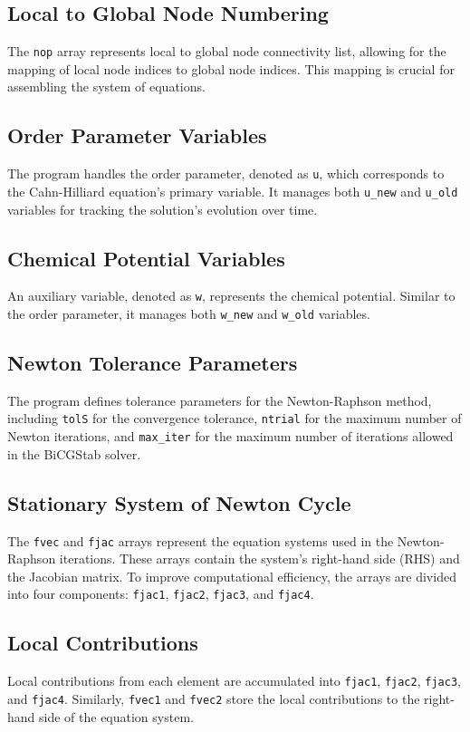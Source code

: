 \documentclass{article}
\begin{document}
\subsection{Local to Global Node Numbering}
The \texttt{nop} array represents local to global node connectivity list, allowing for the mapping of local node indices to global node indices. This mapping is crucial for assembling the system of equations.

\subsection{Order Parameter Variables}
The program handles the order parameter, denoted as \texttt{u}, which corresponds to the Cahn-Hilliard equation's primary variable. It manages both \texttt{u\_new} and \texttt{u\_old} variables for tracking the solution's evolution over time.

\subsection{Chemical Potential Variables}
An auxiliary variable, denoted as \texttt{w}, represents the chemical potential. Similar to the order parameter, it manages both \texttt{w\_new} and \texttt{w\_old} variables.

\subsection{Newton Tolerance Parameters}
The program defines tolerance parameters for the Newton-Raphson method, including \texttt{tolS} for the convergence tolerance, \texttt{ntrial} for the maximum number of Newton iterations, and \texttt{max\_iter} for the maximum number of iterations allowed in the BiCGStab solver.

\subsection{Stationary System of Newton Cycle}
The \texttt{fvec} and \texttt{fjac} arrays represent the equation systems used in the Newton-Raphson iterations. These arrays contain the system's right-hand side (RHS) and the Jacobian matrix. To improve computational efficiency, the arrays are divided into four components: \texttt{fjac1}, \texttt{fjac2}, \texttt{fjac3}, and \texttt{fjac4}.

\subsection{Local Contributions}
Local contributions from each element are accumulated into \texttt{fjac1}, \texttt{fjac2}, \texttt{fjac3}, and \texttt{fjac4}. Similarly, \texttt{fvec1} and \texttt{fvec2} store the local contributions to the right-hand side of the equation system.
\end{document}
